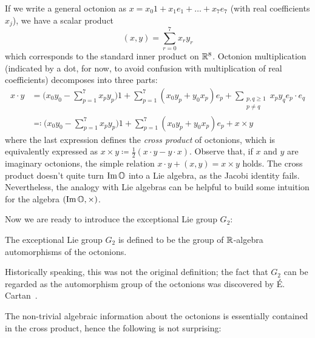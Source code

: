 If we write a general octonion as $x=x_0 1+x_1 e_1+\dots + x_7 e_7$ (with real coefficients $x_j$), we have a scalar product
\begin{equation*}
	(x,y)=\sum_{r=0}^7 x_r y_r
\end{equation*}
which corresponds to the standard inner product on $\mathbb{R}^8$. Octonion multiplication (indicated by a dot, for now, to avoid confusion with multiplication of real coefficients) decomposes into three parts:
\begin{align*}
	x\cdot y&=\bigg(x_0y_0-\sum_{p=1}^7 x_p y_p\bigg)1
	+\sum_{p=1}^7 (x_0y_p+y_0x_p) e_p
	+\sum_{\substack{p,q\geq 1\\ p\neq q}} x_py_q e_p\cdot e_q\\
	&\eqqcolon \bigg(x_0y_0-\sum_{p=1}^7 x_p y_p\bigg)1
	+ \sum_{p=1}^7 (x_0y_p+y_0x_p) e_p + x\times y
\end{align*}
where the last expression defines the \emph{cross product} of octonions, which is equivalently expressed as $x\times y\coloneqq \frac{1}{2}(x\cdot y-y\cdot x)$. Observe that, if $x$ and $y$ are imaginary octonions, the simple relation $x\cdot y+(x,y)=x\times y$ holds. The cross product doesn't quite turn $\operatorname{Im}\mathbb{O}$ into a Lie algebra, as the Jacobi identity fails. Nevertheless, the analogy with Lie algebras can be helpful to build some intuition for the algebra $(\operatorname{Im}\mathbb{O},\times)$. 

Now we are ready to introduce the exceptional Lie group $G_2$:

\begin{mydef}
	The exceptional Lie group $G_2$ is defined to be the group of $\mathbb{R}$-algebra automorphisms of the octonions.
\end{mydef}

\begin{rem}
	Historically speaking, this was not the original definition; the fact that $G_2$ can be regarded as the automorphism group of the octonions was discovered by \'{E}. Cartan~\cite[298]{Car1914}.
\end{rem}

The non-trivial algebraic information about the octonions is essentially contained in the cross product, hence the following is not surprising:


